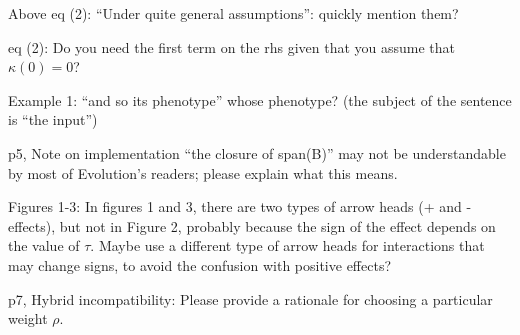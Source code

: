 \begin{point}{Above eq (2):}
    ``Under quite general assumptions'': quickly mention them?
\end{point}


\begin{point}{eq (2):} 
    Do you need the first term on the rhs given that you assume that $\kappa(0)=0$?
\end{point}


\begin{point}{Example 1:}
    ``and so its phenotype'' whose phenotype? (the subject of the sentence is ``the input'')
\end{point}


\begin{point}{p5, Note on implementation}
    ``the closure of span(B)'' may not be
    understandable by most of Evolution's readers; please explain what this means.
\end{point}


\begin{point}{Figures 1-3:}
    In figures 1 and 3, there are two types of arrow heads (+ and -
effects), but not in Figure 2, probably because the sign of the effect depends
on the value of $\tau$. Maybe use a  different type of arrow heads for
interactions that may change signs, to avoid the confusion with positive
effects?
\end{point}


\begin{point}{p7, Hybrid incompatibility:}
    Please provide a rationale for choosing a particular weight $\rho$.
\end{point}

